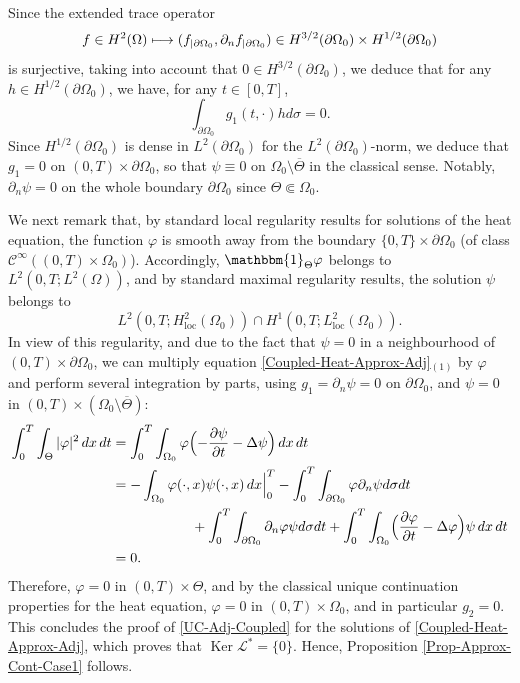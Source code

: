 \documentclass[10pt,a4paper]{amsart}
\newcommand\mto{\mathchoice{\longmapsto}{\mapsto}{\mapsto}{\mapsto}}
\newcommand{\loc}{\mathrm{loc}}
\DeclareMathOperator{\Ker}{Ker}
\theoremstyle{definition}
\begin{document}
Since the extended trace operator
\[
f\in H^2(\Omega)\mto (f_{|\partial\Omega_0},\partial_n f_{|\partial\Omega_0}) \in H^{3/2}(\partial\Omega_0)\times H^{1/2}(\partial\Omega_0)
\]
is surjective, taking into account that $0\in H^{3/2}(\partial\Omega_0)$, we deduce that for any $h\in H^{1/2}(\partial\Omega_0)$, we have, for any $t\in [0,T]$,
\[
\int_{\partial\Omega_0}g_1(t,\cdot) h d\sigma =0.
\]
Since $H^{1/2}(\partial\Omega_0)$ is dense in $L^2(\partial\Omega_0)$ for the $L^2(\partial\Omega_0)$-norm, we deduce that $g_1 = 0$ on $(0,T)\times \partial\Omega_0$, so that $\psi \equiv 0$ on $\Omega_0\setminus \overline{\Theta}$ in the classical sense. Notably, $\partial_n \psi= 0$ on the whole boundary $\partial \Omega_0$ since $\Theta \Subset \Omega_0$.

We next remark that, by standard local regularity results for solutions of the heat equation, the function $\varphi$ is smooth away from the boundary $\{0,T\}\times\partial \Omega_0$ (of class $\mathscr{C}^\infty((0,T) \times \Omega_0)$). Accordingly, $\mathbbm{1}_{\Theta}\varphi $ belongs to $L^2(0,T; L^2(\Omega))$, and by standard maximal regularity results, the solution $\psi$ belongs to
\[
L^2(0,T; H^2_{\loc}(\Omega_0)) \cap H^1(0,T; L^2_{\loc}(\Omega_0)).
\]
In view of this regularity, and due to the fact that $\psi = 0$ in a neighbourhood of $(0,T) \times \partial \Omega_0$, we can multiply equation \eqref{Coupled-Heat-Approx-Adj}$_{(1)}$ by $\varphi$ and perform several integration by parts, using $g_1 = \partial_n\psi =0$ on $\partial\Omega_0$, and $\psi = 0$ in $(0,T) \times (\Omega_0 \setminus \overline{\Theta})$:
\begin{align*}
\int_0^T \int_{\Theta} |\varphi|^2 \, dx\,dt
&=
\int_0^T \int_{\Omega_0} \varphi \Bigl(- \dfrac{\partial \psi}{\partial t}-\Delta \psi\Bigr) \, dx\,dt
\\
&=
- \int_{\Omega_0} \varphi(\cdot,x) \psi(\cdot, x)\, dx\Big|_0^T
-\int_0^T \int_{\partial\Omega_0} \varphi \partial_n \psi d\sigma dt\\
&\hspace*{2cm}+
\int_0^T \int_{\partial\Omega_0} \partial_n \varphi \psi d\sigma dt
+\int_0^T \int_{\Omega_0} \Bigl(\dfrac{\partial \varphi}{\partial t}-\Delta \varphi \Bigr) \psi \, dx\,dt\\
&=0.
\end{align*}
Therefore, $\varphi = 0$ in $(0,T) \times \Theta$, and by the classical unique continuation properties for the heat equation, $\varphi = 0$ in $(0,T) \times \Omega_0$, and in particular $g_2 = 0$. This concludes the proof of \eqref{UC-Adj-Coupled} for the solutions of \eqref{Coupled-Heat-Approx-Adj}, which proves that $\Ker\mathcal{L}^* = \{0\}$. Hence, Proposition \ref{Prop-Approx-Cont-Case1} follows.
\end{document}
